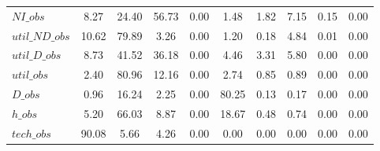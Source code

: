 \begin{center}
\begin{longtable}{lccccccccc}
$NI\_obs        $	 & 	         8.27	 & 	        24.40	 & 	        56.73	 & 	         0.00	 & 	         1.48	 & 	         1.82	 & 	         7.15	 & 	         0.15	 & 	         0.00 \\ 
$util\_ND\_obs  $	 & 	        10.62	 & 	        79.89	 & 	         3.26	 & 	         0.00	 & 	         1.20	 & 	         0.18	 & 	         4.84	 & 	         0.01	 & 	         0.00 \\ 
$util\_D\_obs   $	 & 	         8.73	 & 	        41.52	 & 	        36.18	 & 	         0.00	 & 	         4.46	 & 	         3.31	 & 	         5.80	 & 	         0.00	 & 	         0.00 \\ 
$util\_obs      $	 & 	         2.40	 & 	        80.96	 & 	        12.16	 & 	         0.00	 & 	         2.74	 & 	         0.85	 & 	         0.89	 & 	         0.00	 & 	         0.00 \\ 
$D\_obs         $	 & 	         0.96	 & 	        16.24	 & 	         2.25	 & 	         0.00	 & 	        80.25	 & 	         0.13	 & 	         0.17	 & 	         0.00	 & 	         0.00 \\ 
$h\_obs         $	 & 	         5.20	 & 	        66.03	 & 	         8.87	 & 	         0.00	 & 	        18.67	 & 	         0.48	 & 	         0.74	 & 	         0.00	 & 	         0.00 \\ 
$tech\_obs      $	 & 	        90.08	 & 	         5.66	 & 	         4.26	 & 	         0.00	 & 	         0.00	 & 	         0.00	 & 	         0.00	 & 	         0.00	 & 	         0.00 \\ 
\end{longtable}
 \end{center}

